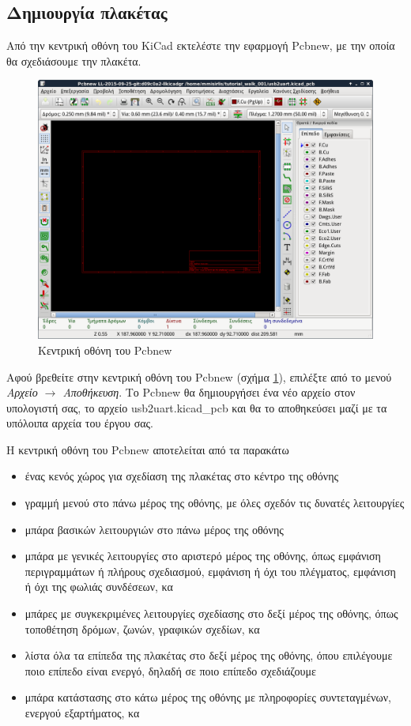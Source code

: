 \documentclass[a4paper]{article}
\begin{document}
\subsection{Δημιουργία πλακέτας}
Από την κεντρική οθόνη του \textenglish{KiCad} εκτελέστε την εφαρμογή Pcbnew, με την οποία θα σχεδιάσουμε την πλακέτα.

\begin{figure}
  \begin{center}
    \includegraphics[width=.9\textwidth]{img/pcb-wind-main.png}
    \caption{Κεντρική οθόνη του Pcbnew}
    \label{fig:pcb-wind-main}
  \end{center}
\end{figure}

Αφού βρεθείτε στην κεντρική οθόνη του Pcbnew (σχήμα \ref{fig:pcb-wind-main}), επιλέξτε από το μενού \textit{Αρχείο $\rightarrow$ Αποθήκευση}. Το Pcbnew θα δημιουργήσει ένα νέο αρχείο στον υπολογιστή σας, το αρχείο usb2uart.kicad\_pcb και θα το αποθηκεύσει μαζί με τα υπόλοιπα αρχεία του έργου σας.

H κεντρική οθόνη του Pcbnew αποτελείται από τα παρακάτω
\begin{itemize}
    \item ένας κενός χώρος για σχεδίαση της πλακέτας στο κέντρο της οθόνης
    \item γραμμή μενού στο πάνω μέρος της οθόνης, με όλες σχεδόν τις δυνατές λειτουργίες
    \item μπάρα βασικών λειτουργιών στο πάνω μέρος της οθόνης
    \item μπάρα με γενικές λειτουργίες στο αριστερό μέρος της οθόνης, όπως εμφάνιση περιγραμμάτων ή πλήρους σχεδιασμού, εμφάνιση ή όχι του πλέγματος, εμφάνιση ή όχι της φωλιάς συνδέσεων, κα
    \item μπάρες με συγκεκριμένες λειτουργίες σχεδίασης στο δεξί μέρος της οθόνης, όπως τοποθέτηση δρόμων, ζωνών, γραφικών σχεδίων, κα
    \item λίστα όλα τα επίπεδα της πλακέτας στο δεξί μέρος της οθόνης, όπου επιλέγουμε ποιο επίπεδο είναι ενεργό, δηλαδή σε ποιο επίπεδο σχεδιάζουμε
    \item μπάρα κατάστασης στο κάτω μέρος της οθόνης με πληροφορίες συντεταγμένων, ενεργού εξαρτήματος, κα
\end{itemize}
\end{document}
